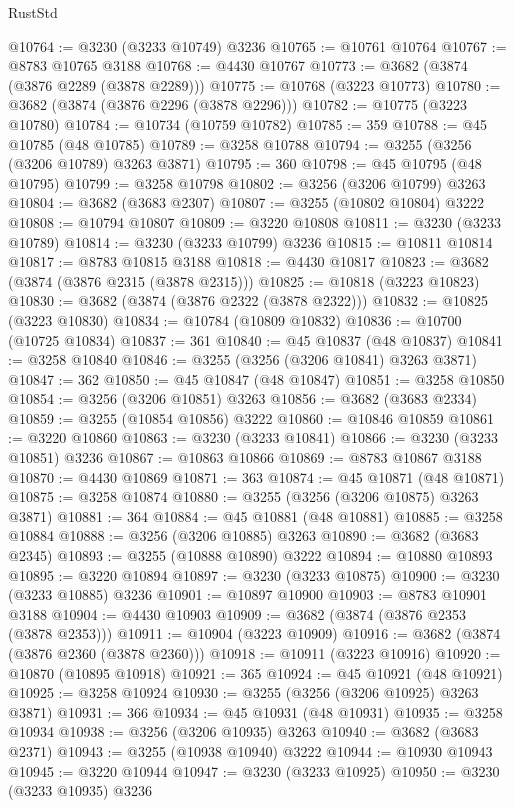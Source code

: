 \begin{lexlean}{RustStd}
\begin{coremodule}
{\begin{coremodule}
{{{{{{{{{{{{{{{{{{{{{{{{{{{{{{{{{{{{{@10764 := @3230 (@3233 @10749) @3236
@10765 := @10761 @10764
@10767 := @8783 @10765 @3188
@10768 := @4430 @10767
@10773 := @3682 (@3874 (@3876 @2289 (@3878 @2289)))
@10775 := @10768 (@3223 @10773)
@10780 := @3682 (@3874 (@3876 @2296 (@3878 @2296)))
@10782 := @10775 (@3223 @10780)
@10784 := @10734 (@10759 @10782)
@10785 := 359
@10788 := @45 @10785 (@48 @10785)
@10789 := @3258 @10788
@10794 := @3255 (@3256 (@3206 @10789) @3263 @3871)
@10795 := 360
@10798 := @45 @10795 (@48 @10795)
@10799 := @3258 @10798
@10802 := @3256 (@3206 @10799) @3263
@10804 := @3682 (@3683 @2307)
@10807 := @3255 (@10802 @10804) @3222
@10808 := @10794 @10807
@10809 := @3220 @10808
@10811 := @3230 (@3233 @10789)
@10814 := @3230 (@3233 @10799) @3236
@10815 := @10811 @10814
@10817 := @8783 @10815 @3188
@10818 := @4430 @10817
@10823 := @3682 (@3874 (@3876 @2315 (@3878 @2315)))
@10825 := @10818 (@3223 @10823)
@10830 := @3682 (@3874 (@3876 @2322 (@3878 @2322)))
@10832 := @10825 (@3223 @10830)
@10834 := @10784 (@10809 @10832)
@10836 := @10700 (@10725 @10834)
@10837 := 361
@10840 := @45 @10837 (@48 @10837)
@10841 := @3258 @10840
@10846 := @3255 (@3256 (@3206 @10841) @3263 @3871)
@10847 := 362
@10850 := @45 @10847 (@48 @10847)
@10851 := @3258 @10850
@10854 := @3256 (@3206 @10851) @3263
@10856 := @3682 (@3683 @2334)
@10859 := @3255 (@10854 @10856) @3222
@10860 := @10846 @10859
@10861 := @3220 @10860
@10863 := @3230 (@3233 @10841)
@10866 := @3230 (@3233 @10851) @3236
@10867 := @10863 @10866
@10869 := @8783 @10867 @3188
@10870 := @4430 @10869
@10871 := 363
@10874 := @45 @10871 (@48 @10871)
@10875 := @3258 @10874
@10880 := @3255 (@3256 (@3206 @10875) @3263 @3871)
@10881 := 364
@10884 := @45 @10881 (@48 @10881)
@10885 := @3258 @10884
@10888 := @3256 (@3206 @10885) @3263
@10890 := @3682 (@3683 @2345)
@10893 := @3255 (@10888 @10890) @3222
@10894 := @10880 @10893
@10895 := @3220 @10894
@10897 := @3230 (@3233 @10875)
@10900 := @3230 (@3233 @10885) @3236
@10901 := @10897 @10900
@10903 := @8783 @10901 @3188
@10904 := @4430 @10903
@10909 := @3682 (@3874 (@3876 @2353 (@3878 @2353)))
@10911 := @10904 (@3223 @10909)
@10916 := @3682 (@3874 (@3876 @2360 (@3878 @2360)))
@10918 := @10911 (@3223 @10916)
@10920 := @10870 (@10895 @10918)
@10921 := 365
@10924 := @45 @10921 (@48 @10921)
@10925 := @3258 @10924
@10930 := @3255 (@3256 (@3206 @10925) @3263 @3871)
@10931 := 366
@10934 := @45 @10931 (@48 @10931)
@10935 := @3258 @10934
@10938 := @3256 (@3206 @10935) @3263
@10940 := @3682 (@3683 @2371)
@10943 := @3255 (@10938 @10940) @3222
@10944 := @10930 @10943
@10945 := @3220 @10944
@10947 := @3230 (@3233 @10925)
@10950 := @3230 (@3233 @10935) @3236
}}}}}}}}}}}}}}}}}}}}}}}}}}}}}}}}}}}}}
\end{coremodule}}
\end{coremodule}
\end{lexlean}
